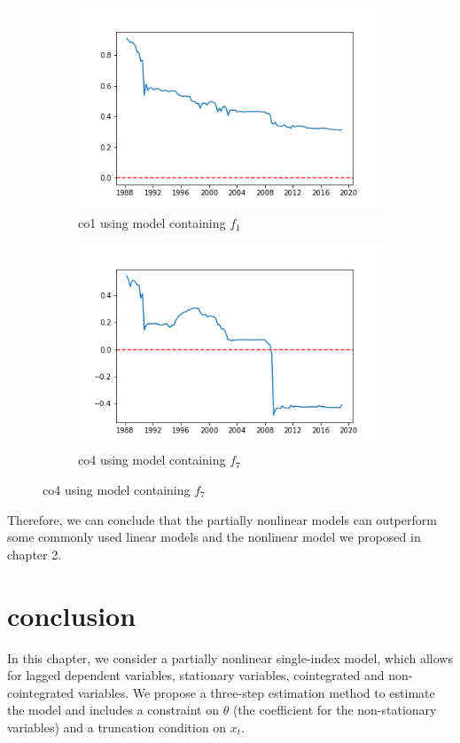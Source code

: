 \documentclass[a4paper,12pt,times,numbered,print,index]{report}
\numberwithin{equation}{section}
\begin{document}
\begin{figure}[!htbp]
	\centering
	\caption{OOS Performance (Benchmark: Nonlinear Model)}
	\begin{subfigure}[b]{0.42\linewidth}
	\includegraphics[width=1.2\linewidth]{plots/co1_NLS_g1.png}
	\caption{co1 using model containing $f_1$}
	\end{subfigure}
	\begin{subfigure}[b]{0.42\linewidth}
	\includegraphics[width=1.2\linewidth]{plots/co4_NLS_g7.png}
	\caption{co4 using model containing $f_7$}
	\end{subfigure}
	\label{vsNL}
\end{figure}

Therefore, we can conclude that the partially nonlinear models can outperform some commonly used linear models and the nonlinear model we proposed in chapter 2. 

\section{conclusion}
In this chapter, we consider a partially nonlinear single-index model, which allows for lagged dependent variables, stationary variables, cointegrated and non-cointegrated variables. We propose a three-step estimation method to estimate the model and includes a constraint on $\theta$ (the coefficient for the non-stationary variables) and a truncation condition on $x_t$. 
\end{document}
